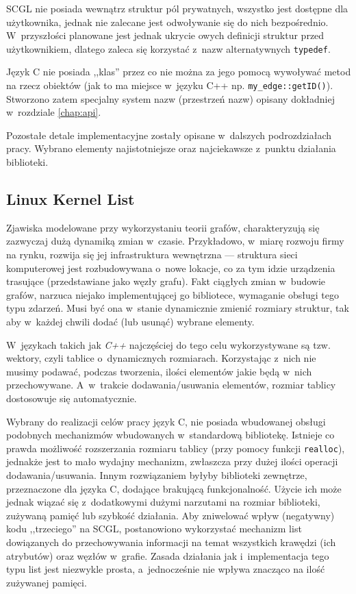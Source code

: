 \documentclass[a4paper,12pt,polish,oneside,openright]{thesis}
\newcommand\code[1]{\lstinline[style=line]{#1}}
\begin{document}
SCGL nie posiada wewnątrz struktur pól prywatnych, wszystko jest dostępne dla użytkownika, jednak nie zalecane jest odwoływanie się do nich bezpośrednio.
W~przyszłości planowane jest jednak ukrycie owych definicji struktur przed użytkownikiem, dlatego zaleca się korzystać z~nazw alternatywnych \code{typedef}.

Język C nie posiada ,,klas'' przez co nie można za jego pomocą wywoływać metod na rzecz obiektów (jak to ma miejsce w~języku C++ np. \code{my_edge::getID()}).
Stworzono zatem specjalny system nazw (przestrzeń nazw) opisany dokładniej w~rozdziale \ref{chap:api}.

Pozostałe detale implementacyjne zostały opisane w~dalszych podrozdziałach pracy.
Wybrano elementy najistotniejsze oraz najciekawsze z~punktu działania biblioteki.

\subsection{Linux Kernel List}
\label{chap:lists}
Zjawiska modelowane przy wykorzystaniu teorii grafów, charakteryzują się zazwyczaj dużą dynamiką zmian w~czasie.
Przykładowo, w~miarę rozwoju firmy na rynku, rozwija się jej infrastruktura wewnętrzna --- struktura sieci komputerowej jest rozbudowywana o~nowe lokacje, co za tym idzie urządzenia trasujące (przedstawiane jako węzły grafu).
Fakt ciągłych zmian w~budowie grafów, narzuca niejako implementującej go bibliotece, wymaganie obsługi tego typu zdarzeń.
Musi być ona w~stanie dynamicznie zmienić rozmiary struktur, tak aby w~każdej chwili dodać (lub usunąć) wybrane elementy.

W~językach takich jak \emph{C++} najczęściej do tego celu wykorzystywane są tzw. wektory, czyli tablice o~dynamicznych rozmiarach.
Korzystając z~nich nie musimy podawać, podczas tworzenia, ilości elementów jakie będą w~nich przechowywane.
A~w~trakcie dodawania/usuwania elementów, rozmiar tablicy dostosowuje się automatycznie.

Wybrany do realizacji celów pracy język C, nie posiada wbudowanej obsługi podobnych mechanizmów wbudowanych w~standardową bibliotekę.
Istnieje co prawda możliwość rozszerzania rozmiaru tablicy (przy pomocy funkcji \code{realloc}), jednakże jest to mało wydajny mechanizm, zwłaszcza przy dużej ilości operacji dodawania/usuwania.
Innym rozwiązaniem byłyby biblioteki zewnętrze, przeznaczone dla języka C, dodające brakującą funkcjonalność.
Użycie ich może jednak wiązać się z~dodatkowymi dużymi narzutami na rozmiar biblioteki, zużywaną pamięć lub szybkość działania.
Aby zniwelować wpływ (negatywny) kodu ,,trzeciego'' na SCGL, postanowiono wykorzystać mechanizm list dowiązanych do przechowywania informacji na temat wszystkich krawędzi (ich atrybutów) oraz węzłów w~grafie.
Zasada działania jak i~implementacja tego typu list jest niezwykle prosta, a~jednocześnie nie wpływa znacząco na ilość zużywanej pamięci.
\end{document}
